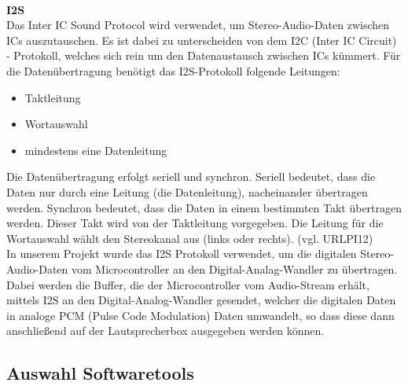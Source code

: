 \documentclass[11pt, twoside]{article}
\begin{document}
\newline \\
\textbf{I2S}\\
Das Inter IC Sound Protocol wird verwendet, um Stereo-Audio-Daten zwischen ICs auszutauschen. Es ist dabei zu unterscheiden von dem I2C (Inter IC Circuit) - Protokoll, welches sich rein um den Datenaustausch zwischen ICs kümmert. Für die Datenübertragung benötigt das I2S-Protokoll folgende Leitungen:
\begin{itemize}
\item Taktleitung
\item Wortauswahl
\item mindestens eine Datenleitung
\end{itemize}
Die Datenübertragung erfolgt seriell und synchron. Seriell bedeutet, dass die Daten nur durch eine Leitung (die Datenleitung), nacheinander übertragen werden. Synchron bedeutet, dass die Daten in einem bestimmten Takt übertragen werden. Dieser Takt wird von der Taktleitung vorgegeben. Die Leitung für die Wortauswahl wählt den Stereokanal aus (links oder rechts). (vgl. URLPI12) \\
In unserem Projekt wurde das I2S Protokoll verwendet, um die digitalen Stereo-Audio-Daten vom Microcontroller an den Digital-Analag-Wandler zu übertragen.
Dabei werden die Buffer, die der Microcontroller vom Audio-Stream erhält, mittels I2S an den Digital-Analog-Wandler gesendet, welcher die digitalen Daten in analoge PCM (Pulse Code Modulation) Daten umwandelt, so dass diese dann anschließend auf der Lautsprecherbox ausgegeben werden können.
\subsection{Auswahl Softwaretools}
\end{document}
